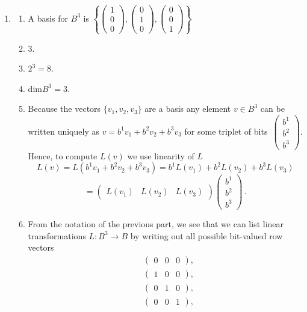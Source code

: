 \begin{enumerate}
\item 
\begin{enumerate}
\item A basis for $B^3$ is $\left\{
\begin{pmatrix}1\\0\\0\end{pmatrix},
\begin{pmatrix}0\\1\\0\end{pmatrix},
\begin{pmatrix}0\\0\\1\end{pmatrix}
\right\}$
\item 3.
\item $2^3=8$.
\item dim$B^3=3$.
\item Because the vectors $\{v_1,v_2,v_3\}$ are a basis any element $v\in B^3$ can be
written uniquely as $v=b^1 v_1 +b^2 v_2+b^3 v_3$ for some triplet of bits~$\begin{pmatrix}b^1\\b^2\\b^3\end{pmatrix}$. Hence, to compute $L(v)$ we use linearity of $L$
$$
L(v) = L(b^1 v_1 +b^2 v_2+b^3 v_3) = b^1 L(v_1)  + b^2 L(v_2) + b^3 L(v_3) $$ $$= \begin{pmatrix}L(v_1) & L(v_2) & L(v_3)\end{pmatrix}
\begin{pmatrix}b^1\\b^2\\b^3\end{pmatrix}\, .
$$
\item From the notation of the previous part, we see that we can list  linear transformations $L:B^3\to B$
by writing out all possible bit-valued row vectors
\begin{eqnarray*}
&\begin{pmatrix}0 & 0 & 0\end{pmatrix} ,\\
&\begin{pmatrix}1 & 0 & 0\end{pmatrix} ,\\
&\begin{pmatrix}0 & 1 & 0\end{pmatrix} ,\\
&\begin{pmatrix}0 & 0 & 1\end{pmatrix} ,\\

\end{eqnarray*}
\end{enumerate}
\end{enumerate}
